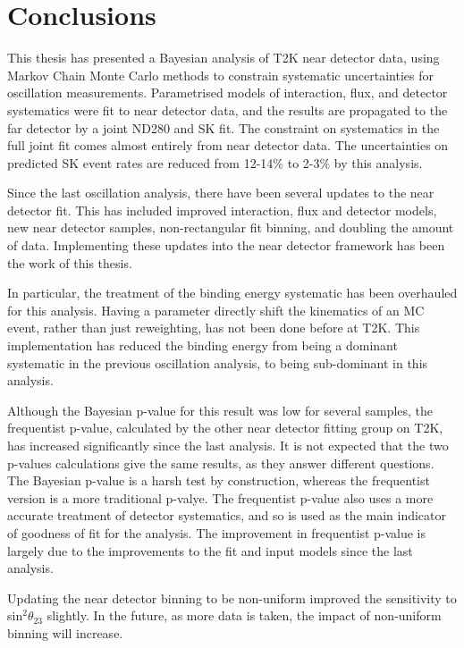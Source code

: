 \chapter{Conclusions}

This thesis has presented a Bayesian analysis of T2K near detector data, using Markov Chain Monte Carlo methods to constrain systematic uncertainties for oscillation measurements. Parametrised models of interaction, flux, and detector systematics were fit to near detector data, and the results are propagated to the far detector by a joint ND280 and SK fit. The constraint on systematics in the full joint fit comes almost entirely from near detector data. The uncertainties on predicted SK event rates are reduced from 12-14$\%$ to 2-3$\%$ by this analysis. 

Since the last oscillation analysis, there have been several updates to the near detector fit. This has included improved interaction, flux and detector models, new near detector samples, non-rectangular fit binning, and doubling the amount of data. Implementing these updates into the near detector framework has been the work of this thesis.

In particular, the treatment of the binding energy systematic has been overhauled for this analysis. Having a parameter directly shift the kinematics of an MC event, rather than just reweighting, has not been done before at T2K. This implementation has reduced the binding energy from being a dominant systematic in the previous oscillation analysis, to being sub-dominant in this analysis.

Although the Bayesian p-value for this result was low for several samples, the frequentist p-value, calculated by the other near detector fitting group on T2K, has increased significantly since the last analysis. It is not expected that the two p-values calculations give the same results, as they answer different questions. The Bayesian p-value is a harsh test by construction, whereas the frequentist version is a more traditional p-valye. The frequentist p-value also uses a more accurate treatment of detector systematics, and so is used as the main indicator of goodness of fit for the analysis. The improvement in frequentist p-value is largely due to the improvements to the fit and input models since the last analysis.

Updating the near detector binning to be non-uniform improved the sensitivity to sin$^2\theta_{23}$ slightly. In the future, as more data is taken, the impact of non-uniform binning will increase.

